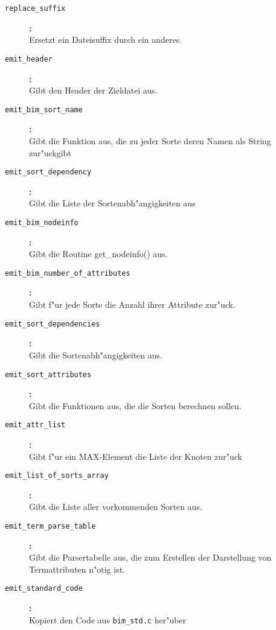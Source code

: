 \begin{description}
\begin{itemize}
\end{itemize}
\item[\tt replace\_suffix
]{\bf :\\}
Ersetzt ein Dateisuffix durch ein anderes.
 \\
\item[\tt emit\_header
]{\bf :\\}
Gibt den Header der Zieldatei aus.
 \\
\item[\tt emit\_bim\_sort\_name
]{\bf :\\}
Gibt die Funktion aus, die zu jeder Sorte deren Namen als String
 zur"uckgibt
 \\
\item[\tt emit\_sort\_dependency
]{\bf :\\}
Gibt die Liste der Sortenabh"angigkeiten aus
 \\
\item[\tt emit\_bim\_nodeinfo
]{\bf :\\}
Gibt die Routine get\_nodeinfo() aus.
 \\
\item[\tt emit\_bim\_number\_of\_attributes
]{\bf :\\}
Gibt f"ur jede Sorte die Anzahl ihrer Attribute zur"uck.
 \\
\item[\tt emit\_sort\_dependencies
]{\bf :\\}
Gibt die Sortenabh"angigkeiten aus.
 \\
\item[\tt emit\_sort\_attributes
]{\bf :\\}
Gibt die Funktionen aus, die die Sorten berechnen sollen.
 \\
\item[\tt emit\_attr\_list
]{\bf :\\}
Gibt f"ur ein MAX-Element die Liste der Knoten zur"uck
 \\
\item[\tt emit\_list\_of\_sorts\_array
]{\bf :\\}
Gibt die Liste aller vorkommenden Sorten aus.
 \\
\item[\tt emit\_term\_parse\_table
]{\bf :\\}
Gibt die Parsertabelle aus, die zum Erstellen der Darstellung von
 Termattributen n"otig ist.
 \\
\item[\tt emit\_standard\_code
]{\bf :\\}
Kopiert den Code aus {\tt bim\_std.c} her"uber
 \\
\end{description}
